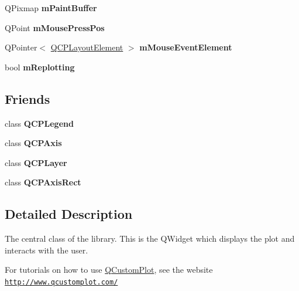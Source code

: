 \begin{DoxyCompactItemize}
\hypertarget{class_q_custom_plot_a753630df96e0672098d9e88bd41d1913}{}\label{class_q_custom_plot_a753630df96e0672098d9e88bd41d1913} 
Q\+Pixmap {\bfseries m\+Paint\+Buffer}
\item 
\hypertarget{class_q_custom_plot_ac57090da95056ae4dd67be67adfa85bd}{}\label{class_q_custom_plot_ac57090da95056ae4dd67be67adfa85bd} 
Q\+Point {\bfseries m\+Mouse\+Press\+Pos}
\item 
\hypertarget{class_q_custom_plot_a2f2e8b25e59cf3cf7b15e4767c02e747}{}\label{class_q_custom_plot_a2f2e8b25e59cf3cf7b15e4767c02e747} 
Q\+Pointer$<$ \hyperlink{class_q_c_p_layout_element}{Q\+C\+P\+Layout\+Element} $>$ {\bfseries m\+Mouse\+Event\+Element}
\item 
\hypertarget{class_q_custom_plot_ab30daeca6612c3948afd368dce5f1c39}{}\label{class_q_custom_plot_ab30daeca6612c3948afd368dce5f1c39} 
bool {\bfseries m\+Replotting}
\end{DoxyCompactItemize}
\subsection*{Friends}
\begin{DoxyCompactItemize}
\item 
\hypertarget{class_q_custom_plot_a8429035e7adfbd7f05805a6530ad5e3b}{}\label{class_q_custom_plot_a8429035e7adfbd7f05805a6530ad5e3b} 
class {\bfseries Q\+C\+P\+Legend}
\item 
\hypertarget{class_q_custom_plot_af123edeca169ec7a31958a1d714e1a8a}{}\label{class_q_custom_plot_af123edeca169ec7a31958a1d714e1a8a} 
class {\bfseries Q\+C\+P\+Axis}
\item 
\hypertarget{class_q_custom_plot_a5dbf96bf7664c1b6fce49063eeea6eef}{}\label{class_q_custom_plot_a5dbf96bf7664c1b6fce49063eeea6eef} 
class {\bfseries Q\+C\+P\+Layer}
\item 
\hypertarget{class_q_custom_plot_acbf20ecb140f66c5fd1bc64ae0762990}{}\label{class_q_custom_plot_acbf20ecb140f66c5fd1bc64ae0762990} 
class {\bfseries Q\+C\+P\+Axis\+Rect}
\end{DoxyCompactItemize}


\subsection{Detailed Description}
The central class of the library. This is the Q\+Widget which displays the plot and interacts with the user. 

For tutorials on how to use \hyperlink{class_q_custom_plot}{Q\+Custom\+Plot}, see the website~\newline
\href{http://www.qcustomplot.com/}{\tt http\+://www.\+qcustomplot.\+com/} 

